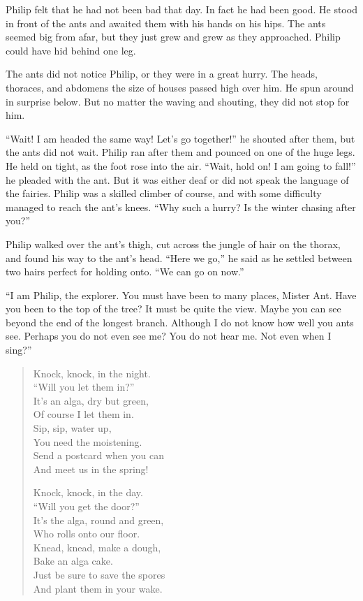 \documentclass[10pt, draft]{memoir}
\begin{document}
Philip felt that he had not been bad that day. In fact he had been good. He stood in front of the ants and awaited them with his hands on his hips. The ants seemed big from afar, but they just grew and grew as they approached. Philip could have hid behind one leg.

The ants did not notice Philip, or they were in a great hurry. The heads, thoraces, and abdomens the size of houses passed high over him. He spun around in surprise below. But no matter the waving and shouting, they did not stop for him.

``Wait! I am headed the same way! Let's go together!'' he shouted after them, but the ants did not wait. Philip ran after them and pounced on one of the huge legs. He held on tight, as the foot rose into the air. ``Wait, hold on! I am going to fall!'' he pleaded with the ant. But it was either deaf or did not speak the language of the fairies. Philip was a skilled climber of course, and with some difficulty managed to reach the ant's knees. ``Why such a hurry? Is the winter chasing after you?''

Philip walked over the ant's thigh, cut across the jungle of hair on the thorax, and found his way to the ant's head. ``Here we go,'' he said as he settled between two hairs perfect for holding onto. ``We can go on now.''

``I am Philip, the explorer. You must have been to many places, Mister Ant. Have you been to the top of the tree? It must be quite the view. Maybe you can see beyond the end of the longest branch. Although I do not know how well you ants see. Perhaps you do not even see me? You do not hear me. Not even when I sing?''


\begin{verse}

Knock, knock, in the night. \\
\vin ``Will you let them in?'' \\
It's an alga, dry but green, \\
\vin Of course I let them in. \\
Sip, sip, water up, \\
\vin You need the moistening. \\
Send a postcard when you can \\
\vin And meet us in the spring!

Knock, knock, in the day. \\
\vin ``Will you get the door?'' \\
It's the alga, round and green, \\
\vin Who rolls onto our floor. \\
Knead, knead, make a dough, \\
\vin Bake an alga cake. \\
Just be sure to save the spores \\
\vin And plant them in your wake.

\end{verse}
\end{document}
